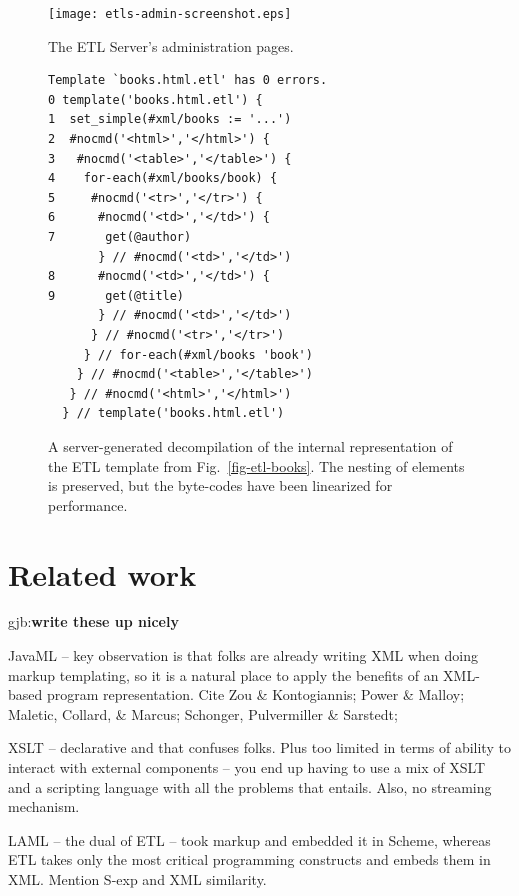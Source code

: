 \documentclass{www2003-submission}
\newcommand{\figref}[1]{Fig.~\ref{fig-#1}}
\newcommand{\gjb}[1]{{\sc gjb:}\textbf{#1}}
\begin{document}
\begin{figure}[tb]
\begin{centering}
\hspace*{-0.05\linewidth}\texttt{[image: etls-admin-screenshot.eps]}
\caption{The ETL Server's administration pages.
\label{fig-etls-admin}}
\end{centering}
\end{figure}



\begin{figure}[htbp]
\begin{verbatim}
Template `books.html.etl' has 0 errors.
0 template('books.html.etl') {
1  set_simple(#xml/books := '...')
2  #nocmd('<html>','</html>') {
3   #nocmd('<table>','</table>') {
4    for-each(#xml/books/book) {
5     #nocmd('<tr>','</tr>') {
6      #nocmd('<td>','</td>') {
7       get(@author)
       } // #nocmd('<td>','</td>')
8      #nocmd('<td>','</td>') {
9       get(@title)
       } // #nocmd('<td>','</td>')
      } // #nocmd('<tr>','</tr>')
     } // for-each(#xml/books 'book')
    } // #nocmd('<table>','</table>')
   } // #nocmd('<html>','</html>')
  } // template('books.html.etl')
\end{verbatim}
\caption{A server-generated decompilation of the internal representation
of the ETL template from \figref{etl-books}.  The nesting of elements
is preserved, but the byte-codes have been linearized for performance.
\label{fig-etl-decompile}}
\end{figure}


\section{Related work}
\label{sec-related-work}

\gjb{write these up nicely}

JavaML -- key observation is that folks are already writing XML when
doing markup templating, so it is a natural place to apply the
benefits of an XML-based program representation.  Cite Zou \&
Kontogiannis; Power \& Malloy; Maletic, Collard, \& Marcus; Schonger,
Pulvermiller \& Sarstedt; 

XSLT -- declarative and that confuses folks.  Plus too limited in
terms of ability to interact with external components -- you end up
having to use a mix of XSLT and a scripting language with all the
problems that entails.  Also, no streaming mechanism.

LAML -- the dual of ETL -- took markup and embedded it in Scheme,
whereas ETL takes only the most critical programming constructs and
embeds them in XML.  Mention S-exp and XML similarity.
\end{document}
